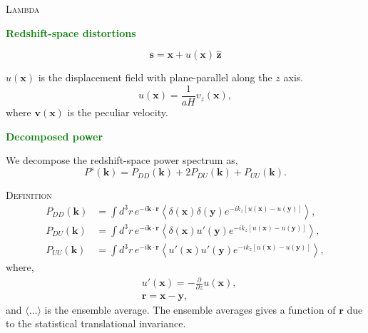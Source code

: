 \documentclass[a4paper,11pt, fleqn]{article}
\begin{document}
%
%
\vspace{0.3 \paperheight}
\begin{center}
  {\Huge \textsc{Lambda}}
\end{center}

%
%
\newpage

{\Huge \textbf{\textcolor{Green}{Redshift-space distortions}}}

\begin{equation}
  \bm{s} = \bm{x} + u(\bm{x}) \, \hat{\bm{z}}
\end{equation}

$u(\bm{x})$ is the displacement field with plane-parallel along the $z$ axis.
\begin{equation}
  u(\bm{x}) = \frac{1}{aH} v_z(\bm{x}),
\end{equation}
where $\bm{v}(\bm{x})$ is the peculiar velocity.

%
%
\newpage

{\Huge \textbf{\textcolor{Green}{Decomposed power}}}

\vspace{10mm}

We decompose the redshift-space power spectrum as,
%
\begin{equation}
  P^s(\bm{k}) = P_{DD}(\bm{k}) + 2 P_{DU}(\bm{k}) + P_{UU}(\bm{k}).
\end{equation}

\vspace{5mm}
\textsc{Definition}
\vspace{-2mm}
%
\begin{align}
  P_{DD}(\bm{k}) &=
  \int\! d^3 r \, e^{-i \bm{k}\cdot\bm{r}}
  \left\langle
    \delta(\bm{x}) \delta(\bm{y}) e^{-ik_z [u(\bm{x}) - u(\bm{y})]}
    \right\rangle,\\
  P_{DU}(\bm{k}) &=
  \int\! d^3 r \, e^{-i \bm{k}\cdot\bm{r}}
  \left\langle
    \delta(\bm{x}) u'(\bm{y}) e^{-ik_z [u(\bm{x}) - u(\bm{y})]}
    \right\rangle,\\
  P_{UU}(\bm{k}) &=
  \int\! d^3 r \, e^{-i \bm{k}\cdot\bm{r}}
  \left\langle
    u'(\bm{x}) u'(\bm{y}) e^{-ik_z [u(\bm{x}) - u(\bm{y})]}
    \right\rangle,
\end{align}
%
where,
\begin{align}
  &u'(\bm{x}) = - \frac{\partial}{\partial z} u(\bm{x}),\\
  &\bm{r}     = \bm{x} - \bm{y},
\end{align}
%
and $\langle\dots\rangle$ is the ensemble average. The ensemble
averages gives a function of $\bm{r}$ due to the statistical
translational invariance.
\end{document}
